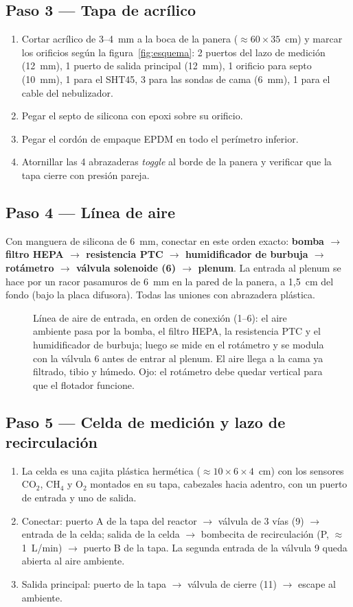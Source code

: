 \documentclass[11pt,a4paper]{article}
\newcommand{\paso}[1]{\subsection*{\large Paso #1}}
\begin{document}
\paso{3 --- Tapa de acrílico}
\begin{enumerate}
  \item Cortar acrílico de 3--4~mm a la boca de la panera
        (${\approx}60\times35$~cm) y marcar los orificios según la
        figura~\ref{fig:esquema}: 2 puertos del lazo de medición (12~mm),
        1 puerto de salida principal (12~mm), 1 orificio para septo (10~mm),
        1 para el SHT45, 3 para las sondas de cama (6~mm), 1 para el cable del
        nebulizador.
  \item Pegar el septo de silicona con epoxi sobre su orificio.
  \item Pegar el cordón de empaque EPDM en todo el perímetro inferior.
  \item Atornillar las 4 abrazaderas \emph{toggle} al borde de la panera y
        verificar que la tapa cierre con presión pareja.
\end{enumerate}

\paso{4 --- Línea de aire}
Con manguera de silicona de 6~mm, conectar en este orden exacto:
\textbf{bomba $\rightarrow$ filtro HEPA $\rightarrow$ resistencia PTC
$\rightarrow$ humidificador de burbuja $\rightarrow$ rotámetro $\rightarrow$
válvula solenoide (6) $\rightarrow$ plenum}. La entrada al plenum se hace por
un racor pasamuros de 6~mm en la pared de la panera, a 1,5~cm del fondo (bajo
la placa difusora). Todas las uniones con abrazadera plástica.

\begin{figure}[htb]
\centering
\resizebox{\textwidth}{!}{}
\caption{Línea de aire de entrada, en orden de conexión (1--6): el aire ambiente pasa por la bomba, el filtro HEPA, la resistencia PTC y el humidificador de burbuja; luego se mide en el rotámetro y se modula con la válvula 6 antes de entrar al plenum. El aire llega a la cama ya filtrado, tibio y húmedo. Ojo: el rotámetro debe quedar vertical para que el flotador funcione.}
\label{fig:linea}
\end{figure}

\paso{5 --- Celda de medición y lazo de recirculación}
\begin{enumerate}
  \item La celda es una cajita plástica hermética (${\approx}10\times6\times4$~cm)
        con los sensores CO$_2$, CH$_4$ y O$_2$ montados en su tapa,
        cabezales hacia adentro, con un puerto de entrada y uno de salida.
  \item Conectar: puerto A de la tapa del reactor $\rightarrow$ válvula de 3
        vías (9) $\rightarrow$ entrada de la celda; salida de la celda
        $\rightarrow$ bombecita de recirculación (P, ${\approx}$1~L/min)
        $\rightarrow$ puerto B de la tapa. La segunda entrada de la válvula 9
        queda abierta al aire ambiente.
  \item Salida principal: puerto de la tapa $\rightarrow$ válvula de cierre
        (11) $\rightarrow$ escape al ambiente.
\end{enumerate}
\end{document}
